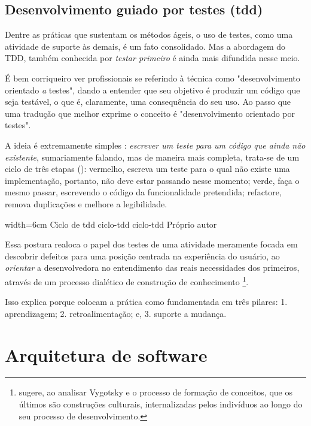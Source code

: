     \subsection{Desenvolvimento guiado por testes (tdd)}

      Dentre as práticas que sustentam os métodos ágeis, o uso de testes, como uma atividade de suporte às demais, é um fato consolidado. Mas a abordagem do TDD, também conhecida por \emph{testar primeiro} é ainda mais difundida nesse  meio.

      É bem corriqueiro ver profissionais se referindo à  técnica como "desenvolvimento orientado \emph{a} testes", dando a entender que seu objetivo é produzir um código que seja testável, o que é, claramente, uma consequência do seu uso. Ao passo que uma tradução que melhor exprime o conceito é "desenvolvimento orientado {por} testes".

      A ideia é extremamente simples \cite[p.1]{FreemanPryce2009}: \emph{escrever um teste para um código que ainda não existente}, sumariamente falando, mas de maneira mais completa, trata-se de um ciclo de três etapas\cite[pág. x] {Beck2003} (): vermelho,  escreva um teste para o qual não existe uma implementação, portanto, não deve estar passando nesse momento; verde, faça o mesmo passar, escrevendo o código da funcionalidade pretendida; refactore, remova duplicações e melhore a legibilidade.

      \imagem
        {width=6cm}
        {Ciclo de tdd}
        {ciclo-tdd}
        {ciclo-tdd}
        {Próprio autor\footnotemark}

      Essa postura realoca o papel dos testes de uma atividade meramente focada em descobrir defeitos para uma posição centrada na experiência do usuário, ao  \emph{orientar} a desenvolvedora no entendimento das reais necessidades dos primeiros, através de um processo dialético de construção de conhecimento \footnote{ sugere, ao analisar Vygotsky e o processo de formação de conceitos, que os últimos são construções culturais, internalizadas pelos indivíduos ao longo do seu processo de desenvolvimento.}.

      Isso explica porque  colocam a prática como fundamentada em três pilares: 1. aprendizagem; 2. retroalimentação; e, 3. suporte a mudança.

  \section{Arquitetura de software}

